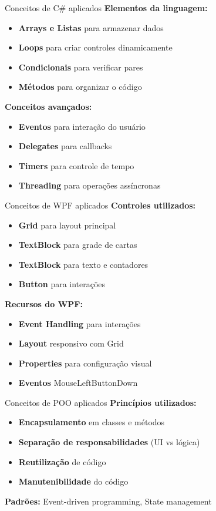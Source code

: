 \documentclass[aspectratio=169]{beamer}
\begin{document}
\begin{frame}{Conceitos de C\# aplicados}
\textbf{Elementos da linguagem:}
\begin{itemize}
    \item \textbf{Arrays e Listas} para armazenar dados
    \item \textbf{Loops} para criar controles dinamicamente
    \item \textbf{Condicionais} para verificar pares
    \item \textbf{Métodos} para organizar o código
\end{itemize}

\textbf{Conceitos avançados:}
\begin{itemize}
    \item \textbf{Eventos} para interação do usuário
    \item \textbf{Delegates} para callbacks
    \item \textbf{Timers} para controle de tempo
    \item \textbf{Threading} para operações assíncronas
\end{itemize}
\end{frame}

\begin{frame}{Conceitos de WPF aplicados}
\textbf{Controles utilizados:}
\begin{itemize}
    \item \textbf{Grid} para layout principal
    \item \textbf{TextBlock} para grade de cartas
    \item \textbf{TextBlock} para texto e contadores
    \item \textbf{Button} para interações
\end{itemize}

\textbf{Recursos do WPF:}
\begin{itemize}
    \item \textbf{Event Handling} para interações
    \item \textbf{Layout} responsivo com Grid
    \item \textbf{Properties} para configuração visual
    \item \textbf{Eventos} MouseLeftButtonDown
\end{itemize}
\end{frame}

\begin{frame}{Conceitos de POO aplicados}
\textbf{Princípios utilizados:}
\begin{itemize}
    \item \textbf{Encapsulamento} em classes e métodos
    \item \textbf{Separação de responsabilidades} (UI vs lógica)
    \item \textbf{Reutilização} de código
    \item \textbf{Manutenibilidade} do código
\end{itemize}

\textbf{Padrões:} Event-driven programming, State management
\end{frame}
\end{document}
